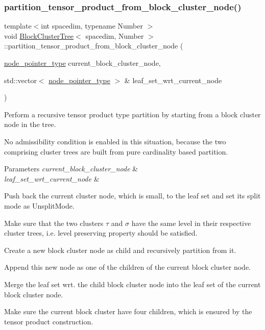 \subsubsection{\texorpdfstring{partition\+\_\+tensor\+\_\+product\+\_\+from\+\_\+block\+\_\+cluster\+\_\+node()}{partition\_tensor\_product\_from\_block\_cluster\_node()}}
{\footnotesize\ttfamily template$<$int spacedim, typename Number $>$ \\
void \hyperlink{classBlockClusterTree}{Block\+Cluster\+Tree}$<$ spacedim, Number $>$\+::partition\+\_\+tensor\+\_\+product\+\_\+from\+\_\+block\+\_\+cluster\+\_\+node (\begin{DoxyParamCaption}\item[{\hyperlink{classTreeNode}{node\+\_\+pointer\+\_\+type}}]{current\+\_\+block\+\_\+cluster\+\_\+node,  }\item[{std\+::vector$<$ \hyperlink{classTreeNode}{node\+\_\+pointer\+\_\+type} $>$ \&}]{leaf\+\_\+set\+\_\+wrt\+\_\+current\+\_\+node }\end{DoxyParamCaption})\hspace{0.3cm}{\ttfamily [private]}}

Perform a recursive tensor product type partition by starting from a block cluster node in the tree.

No admissibility condition is enabled in this situation, because the two comprising cluster trees are built from pure cardinality based partition. 
\begin{DoxyParams}{Parameters}
{\em current\+\_\+block\+\_\+cluster\+\_\+node} & \\
\hline
{\em leaf\+\_\+set\+\_\+wrt\+\_\+current\+\_\+node} & \\
\hline
\end{DoxyParams}
Push back the current cluster node, which is small, to the leaf set and set its split mode as {\ttfamily Unsplit\+Mode}.

Make sure that the two clusters $\tau$ and $\sigma$ have the same level in their respective cluster trees, i.\+e. level preserving property should be satisfied.

Create a new block cluster node as child and recursively partition from it.

Append this new node as one of the children of the current block cluster node.

Merge the leaf set wrt. the child block cluster node into the leaf set of the current block cluster node.

Make sure the current block cluster have four children, which is ensured by the tensor product construction.


